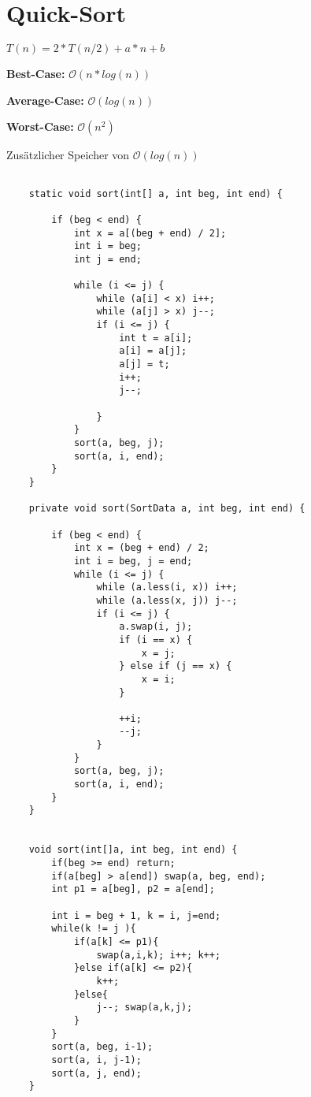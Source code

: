 \section*{Quick-Sort}

$T(n) = 2*T(n/2) + a*n + b$

\textbf{Best-Case:} $\mathcal{O}(n*log(n))$

\textbf{Average-Case:} $\mathcal{O}(log(n))$

\textbf{Worst-Case:} $\mathcal{O}(n^2)$

Zusätzlicher Speicher von $\mathcal{O}(log(n))$

\begin{verbatim}

	static void sort(int[] a, int beg, int end) {

        if (beg < end) {
            int x = a[(beg + end) / 2];
            int i = beg;
            int j = end;

            while (i <= j) {
                while (a[i] < x) i++;
                while (a[j] > x) j--;
                if (i <= j) {
                    int t = a[i];
                    a[i] = a[j];
                    a[j] = t;
                    i++;
                    j--;

                }
            }
            sort(a, beg, j);
            sort(a, i, end);
        }
    }

    private void sort(SortData a, int beg, int end) {

        if (beg < end) {
            int x = (beg + end) / 2;
            int i = beg, j = end;
            while (i <= j) {
                while (a.less(i, x)) i++;
                while (a.less(x, j)) j--;
                if (i <= j) {
                    a.swap(i, j);
                    if (i == x) {
                        x = j;
                    } else if (j == x) {
                        x = i;
                    }

                    ++i;
                    --j;
                }
            }
            sort(a, beg, j);
            sort(a, i, end);
        }
    }
    
    
   	void sort(int[]a, int beg, int end) {
        if(beg >= end) return;
        if(a[beg] > a[end]) swap(a, beg, end);
        int p1 = a[beg], p2 = a[end];

        int i = beg + 1, k = i, j=end;
        while(k != j ){
            if(a[k] <= p1){
                swap(a,i,k); i++; k++;
            }else if(a[k] <= p2){
                k++;
            }else{
                j--; swap(a,k,j);
            }
        }
        sort(a, beg, i-1);
        sort(a, i, j-1);
        sort(a, j, end);
    }

\end{verbatim}

